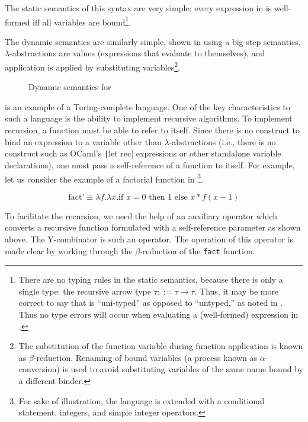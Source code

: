 The static semantics of this syntax are very simple: every expression in \ulc{} is well-formed iff all variables are bound\footnote{There are no typing rules in the static semantics, because there is only a single type: the recursive arrow type $\tau::=\tau\to\tau$. Thus, it may be more correct to say that \ulc{} is ``uni-typed'' as opposed to ``untyped,'' as noted in \cite{harper2016practical}. Thus no type errors will occur when evaluating a (well-formed) expression in \ulc{}.}.

The dynamic semantics are similarly simple, shown in  using a big-step semantics. $\lambda$-abstractions are values (expressions that evaluate to themselves), and application is applied by substituting variables\footnote{The substitution of the function variable during function application is known as $\beta$-reduction. Renaming of bound variables (a process known as $\alpha$-conversion) is used to avoid substituting variables of the same name bound by a different binder.}.

\begin{figure}
  \centering
  \begin{mdframed}
    \begin{singlespace}
      
    \end{singlespace}
  \end{mdframed}
  \caption{Dynamic semantics for \ulc}
  \label{fig:dynamic-semantics-ulc}
\end{figure}

\ulc{} is an example of a Turing-complete language. One of the key characteristics to such a language is the ability to implement recursive algorithms. To implement recursion, a function must be able to refer to itself. Since there is no construct to bind an expression to a variable other than $\lambda$-abstractions (i.e., there is no construct such as OCaml's \texttt|let rec| expressions or other standalone variable declarations), one must pass a self-reference of a function to itself. For example, let us consider the example of a factorial function in \ulc{}\footnote{For sake of illustration, the language is extended with a conditional statement, integers, and simple integer operators.}.

\[\text{fact'}\equiv\lambda f.\lambda x.\text{if }x=0\text{ then }1\text{ else }x*f(x-1)\]

To facilitate the recursion, we need the help of an auxiliary operator which converts a recursive function formulated with a self-reference parameter as shown above. The Y-combinator is such an operator. The operation of this operator is made clear by working through the $\beta$-reduction of the \texttt{fact} function.

